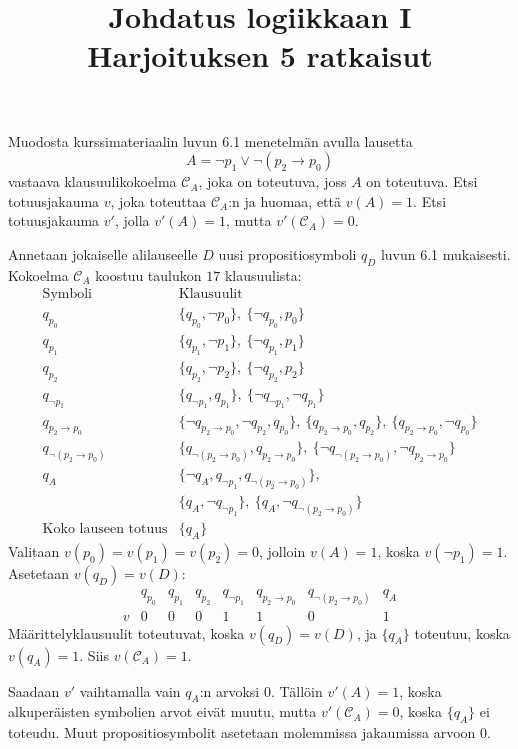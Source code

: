 \documentclass[11pt,a4paper]{amsart}
\title{Johdatus logiikkaan I\\Harjoituksen 5 ratkaisut}
\author{}
\date{}
\begin{document}

\begin{exercise}
  Muodosta kurssimateriaalin luvun 6.1 menetelmän avulla lausetta
  \[
    A = \neg p_1 \lor \neg(p_2 \rightarrow p_0)
  \]
  vastaava klausuulikokoelma \(\mathcal{C}_A\), joka on toteutuva, joss
  \(A\) on toteutuva. Etsi totuusjakauma \(v\), joka toteuttaa
  \(\mathcal{C}_A\):n ja huomaa, että \(v(A) = 1\). Etsi totuusjakauma
  \(v'\), jolla \(v'(A) = 1\), mutta \(v'(\mathcal{C}_A) = 0\).
\end{exercise}

\begin{solution}
  Annetaan jokaiselle alilauseelle \(D\) uusi propositiosymboli \(q_D\)
  luvun 6.1 mukaisesti. Kokoelma \(\mathcal C_A\) koostuu taulukon
  \(17\) klausuulista:
  \[
    \begin{array}{c|l}
      \text{Symboli} & \text{Klausuulit}\\ \hline
      q_{p_0} & \{q_{p_0},\neg p_0\},\ \{\neg q_{p_0},p_0\}\\
      q_{p_1} & \{q_{p_1},\neg p_1\},\ \{\neg q_{p_1},p_1\}\\
      q_{p_2} & \{q_{p_2},\neg p_2\},\ \{\neg q_{p_2},p_2\}\\
      q_{\neg p_1} & \{q_{\neg p_1},q_{p_1}\},\ \{\neg q_{\neg
      p_1},\neg q_{p_1}\}\\
      q_{p_2\to p_0} & \{\neg q_{p_2\to p_0},\neg
      q_{p_2},q_{p_0}\},\ \{q_{p_2\to p_0},q_{p_2}\},\ \{q_{p_2\to
      p_0},\neg q_{p_0}\}\\
      q_{\neg(p_2\to p_0)} & \{q_{\neg(p_2\to p_0)},q_{p_2\to
      p_0}\},\ \{\neg q_{\neg(p_2\to p_0)},\neg q_{p_2\to p_0}\}\\
      q_A & \{\neg q_A,q_{\neg p_1},q_{\neg(p_2\to p_0)}\},\\
      & \{q_A,\neg q_{\neg p_1}\},\ \{q_A,\neg q_{\neg(p_2\to p_0)}\}\\
      \text{Koko lauseen totuus} & \{q_A\}
    \end{array}
  \]
  Valitaan \(v(p_0)=v(p_1)=v(p_2)=0\), jolloin \(v(A)=1\), koska
  \(v(\neg p_1)=1\). Asetetaan \(v(q_D)=v(D)\):
  \[
    \begin{array}{c|ccccccc}
      &q_{p_0}&q_{p_1}&q_{p_2}&q_{\neg p_1}&q_{p_2\to
      p_0}&q_{\neg(p_2\to p_0)}&q_A\\ \hline
      v&0&0&0&1&1&0&1
    \end{array}
  \]
  Määrittelyklausuulit toteutuvat, koska \(v(q_D)=v(D)\), ja
  \(\{q_A\}\) toteutuu, koska \(v(q_A)=1\). Siis
  \(v(\mathcal{C}_A)=1\).

  Saadaan \(v'\) vaihtamalla vain \(q_A\):n arvoksi \(0\).
  Tällöin \(v'(A)=1\), koska alkuperäisten symbolien arvot eivät muutu,
  mutta \(v'(\mathcal C_A)=0\), koska \(\{q_A\}\) ei toteudu.
  Muut propositiosymbolit asetetaan molemmissa jakaumissa arvoon \(0\).
\end{solution}
\end{document}
